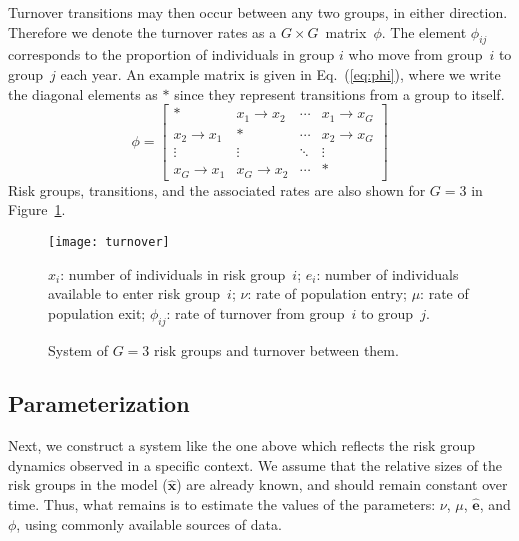 Turnover transitions may then occur between any two groups, in either direction.
Therefore we denote the turnover rates as a $G \times G$~matrix~$\phi$.
The element $\phi_{ij}$ corresponds to the proportion of individuals in group $i$
who move from group~$i$ to group~$j$ each year.
An example matrix is given in Eq.~(\ref{eq:phi}),
where we write the diagonal elements as $*$ since they represent
transitions from a group to itself.
\begin{equation}\label{eq:phi}
\phi = \left[\begin{array}{cccc}
           *          & x_1  \rightarrow x_2 & \cdots & x_1 \rightarrow x_G \\[0.5em]
  x_2 \rightarrow x_1 &          *           & \cdots & x_2 \rightarrow x_G \\[0.5em]
        \vdots        &        \vdots        & \ddots &       \vdots        \\[0.5em]
  x_G \rightarrow x_1 & x_G \rightarrow x_2  & \cdots &          *
\end{array}\right]
\end{equation}
Risk groups, transitions, and the associated rates
are also shown for $G = 3$ in Figure~\ref{fig:system-app}.
\begin{figure}
  \centering
  \texttt{[image: turnover]}
  \caption{System of $G = 3$ risk groups and turnover between them.}
  \footnotesize\raggedright
  $x_i$: number of individuals in risk group~$i$;
  $e_i$: number of individuals available to enter risk group~$i$;
  $\nu$: rate of population entry;
  $\mu$: rate of population exit;
  $\phi_{ij}$: rate of turnover from group~$i$ to group~$j$.
  \label{fig:system-app}
\end{figure}
\subsection{Parameterization}
\label{aa:params}
Next, we construct a system like the one above
which reflects the risk group dynamics observed in a specific context.
We assume that the relative sizes of the risk groups in the model ($\bm{\hat{x}}$)
are already known, and should remain constant over time.
Thus, what remains is to estimate the values of the parameters:
$\nu$, $\mu$, $\bm{\hat{e}}$, and $\phi$,
using commonly available sources of data.
